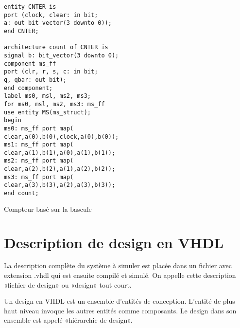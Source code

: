 \documentclass[letter, oneside]{book}
\begin{document}
\begin{listing}[htbp]
\begin{verbatim}
entity CNTER is
port (clock, clear: in bit;
a: out bit_vector(3 downto 0));
end CNTER;

architecture count of CNTER is
signal b: bit_vector(3 downto 0);
component ms_ff
port (clr, r, s, c: in bit;
q, qbar: out bit);
end component;
label ms0, msl, ms2, ms3;
for ms0, msl, ms2, ms3: ms_ff
use entity MS(ms_struct);
begin
ms0: ms_ff port map(
clear,a(0),b(0),clock,a(0),b(0));
ms1: ms_ff port map(
clear,a(1),b(1),a(0),a(1),b(1));
ms2: ms_ff port map(
clear,a(2),b(2),a(1),a(2),b(2));
ms3: ms_ff port map(
clear,a(3),b(3),a(2),a(3),b(3));
end count;
\end{verbatim}
\caption{Compteur basé sur la bascule}
\end{listing}


\section{Description de design en VHDL}
\label{sec:orgc0debce}

La description complète du système à simuler est placée dans un
fichier avec extension .vhdl qui est ensuite compilé et simulé.  On
appelle cette description «fichier de design» ou «design» tout court.

Un design en VHDL est un ensemble d'entités de conception. L'entité de
plus haut niveau invoque les autres entités comme composants. Le design
dans son ensemble est appelé «hiérarchie de design».
\end{document}
